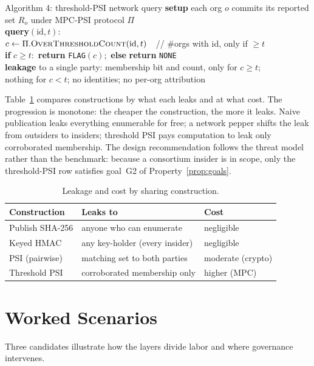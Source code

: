 \documentclass[11pt]{article}
\newcommand{\code}[1]{\texttt{\small #1}}
\begin{document}
\begin{algbox}{Algorithm 4: threshold-PSI network query}
\ttfamily\small
\textbf{setup} each org $o$ commits its reported set $R_o$ under MPC-PSI protocol $\Pi$\\
\textbf{query}$(\mathrm{id}, t)$:\\
\hspace*{1.2em}$c \leftarrow \Pi.\textsc{OverThresholdCount}(\mathrm{id}, t)$\ \ // \#orgs with id, only if $\ge t$\\
\hspace*{1.2em}\textbf{if} $c \ge t$:\ \textbf{return} \code{FLAG}$(c)$;\ \textbf{else} \textbf{return} \code{NONE}\\
\textbf{leakage} to a single party: membership bit and count, only for $c\ge t$;\\
\hspace*{1.2em}nothing for $c<t$; no identities; no per-org attribution
\end{algbox}

Table~\ref{tab:leakage} compares constructions by what each leaks and at what
cost. The progression is monotone: the cheaper the construction, the more it
leaks. Naive publication leaks everything enumerable for free; a network pepper
shifts the leak from outsiders to insiders; threshold PSI pays computation to
leak only corroborated membership. The design recommendation follows the threat
model rather than the benchmark: because a consortium insider is in scope, only
the threshold-PSI row satisfies goal~G2 of Property~\ref{prop:goals}.

\begin{table}[t]\centering\small
\caption{Leakage and cost by sharing construction.}\label{tab:leakage}
\begin{tabular}{lp{4.0cm}p{4.6cm}}
\toprule
Construction & Leaks to & Cost\\
\midrule
Publish SHA-256 & anyone who can enumerate & negligible\\
Keyed HMAC & any key-holder (every insider) & negligible\\
PSI (pairwise) & matching set to both parties & moderate (crypto)\\
\rowcolor{good} Threshold PSI & corroborated membership only & higher (MPC)\\
\bottomrule
\end{tabular}
\end{table}

\section{Worked Scenarios}\label{sec:scenarios}
Three candidates illustrate how the layers divide labor and where governance
intervenes.
\end{document}
